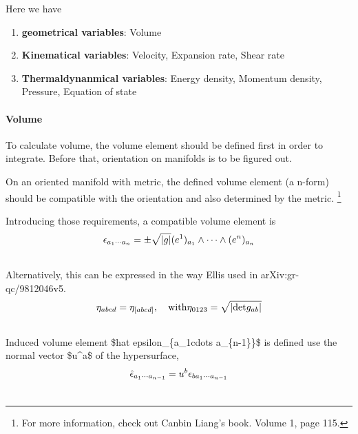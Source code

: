 \documentclass[letterpaper,10pt,english]{sphinxmanual}
\begin{document}
{Here we have
\begin{enumerate}
\item {} 
\textbf{geometrical variables}: Volume

\item {} 
\textbf{Kinematical variables}: Velocity, Expansion rate, Shear rate

\item {} 
\textbf{Thermaldynanmical variables}: Energy density, Momentum density, Pressure, Equation of state

\end{enumerate}


\paragraph{Volume}
\label{GeneralRelativity:volume}
To calculate volume, the volume element should be defined first in order to integrate. Before that, orientation on manifolds is to be figured out.

On an oriented manifold with metric, the defined volume element (a n-form) should be compatible with the orientation and also determined by the metric. \footnote{
For more information, check out Canbin Liang's book. Volume 1, page 115.
}

Introducing those requirements, a compatible volume element is
\begin{gather}
\begin{split}\begin{equation}
\epsilon_{a_1\cdots a_n} = \pm \sqrt{|g|} (e^1)_{a_1}\wedge \cdots \wedge (e^n)_{a_n}
\end{equation}\end{split}\notag\\\begin{split}\end{split}\notag
\end{gather}
Alternatively, this can be expressed in the way Ellis used in arXiv:gr-qc/9812046v5.
\begin{gather}
\begin{split}\begin{equation}
\eta_{abcd} = \eta_{[abcd]}, \quad \mathrm{with} \eta_{0123} = \sqrt{|\mathrm {det} g_{ab}|}
\end{equation}\end{split}\notag\\\begin{split}\end{split}\notag
\end{gather}
Induced volume element \$hat epsilon\_\{a\_1cdots a\_\{n-1\}\}\$ is defined use the normal vector \$u\textasciicircum{}a\$ of the hypersurface,
\begin{gather}
\begin{split}\begin{equation}
\hat \epsilon_{a_1\cdots a_{n-1}} = u^b \epsilon_{b a_1 \cdots a_{n-1}}
\end{equation}\end{split}\notag\\\begin{split}\end{split}\notag
\end{gather}

}
\end{document}
